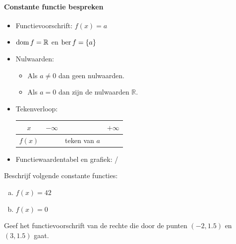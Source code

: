 \documentclass[12pt]{article}
\begin{document}
\begin{theorie}

\paragraph*{Constante functie bespreken}
\begin{mdframed}
  \begin{itemize}
  \item Functievoorschrift: $f(x)=a$
  \item $\dom f = \mathbb{R}$ en $\ber f = \{a\}$
  \item Nulwaarden:
    \begin{itemize}
    \item Als $a\neq 0$ dan geen nulwaarden.
    \item Als $a=0$ dan zijn de nulwaarden $\mathbb{R}$.
    \end{itemize}
  \item Tekenverloop:
    \begin{center}
      \begin{tabular}{c|lcr}
        $x$ & $-\infty$ & & $+\infty$\\
        \hline
        $f(x)$ & & teken van $a$ &
      \end{tabular}
    \end{center}
  \item Functiewaardentabel en grafiek: /
  \end{itemize}
\end{mdframed}

\end{theorie}

\begin{oefening}
  Beschrijf volgende constante functies:
  \begin{enumerate}[(a)]
  \item $f(x)=42$
  \item $f(x)=0$
  \end{enumerate}
\end{oefening}

\begin{oefening}
  Geef het functievoorschrift van de rechte die door de punten $(-2,1.5)$ en $(3,1.5)$ gaat.
\end{oefening}
\end{document}
